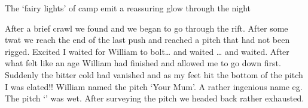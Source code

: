 \begin{marginfigure}
\centering
  \caption{The `fairy lights' of camp \protect{} emit a reassuring glow through the night}
\end{marginfigure}

After a brief crawl we found   and we began to go through the rift. After some twat we reach the end of the last push and reached a pitch that had not been rigged. Excited I waited for William to bolt… and waited … and waited. After what felt like an age William had finished and allowed me to go down first. Suddenly the bitter cold had vanished and as my feet hit the bottom of the pitch I was elated!! William named the pitch `Your Mum'. A rather ingenious name eg. The pitch `' was wet. After surveying the pitch we headed back rather exhausted. 



